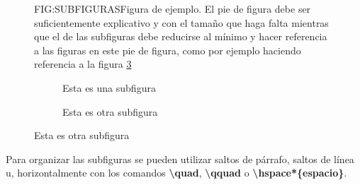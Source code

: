 \begin{figure}[Ejemplo de uso de figure]{FIG:SUBFIGURAS}{Figura de ejemplo. El pie de figura debe ser suficientemente explicativo y con el tamaño que haga falta mientras que el de las subfiguras debe reducirse al mínimo y hacer referencia a las figuras en este pie de figura, como por ejemplo haciendo referencia a la figura \ref{SBFIG:DOS}}
  \begin{subfigure}[b]{0.3\linewidth}
    \centering
    \caption{Esta es una subfigura}\label{SBFIG:UNA}
  \end{subfigure} \quad
  \begin{subfigure}[b]{0.3\linewidth}
    \centering
    \caption{Esta es otra subfigura}\label{SBFIG:DOS}
  \end{subfigure}
\end{figure}

Para organizar las subfiguras se pueden utilizar saltos de párrafo, saltos de línea u, horizontalmente con los comandos \textbf{\textbackslash quad}, \textbf{\textbackslash qquad} o \textbf{\textbackslash hspace*\{espacio\}}.

